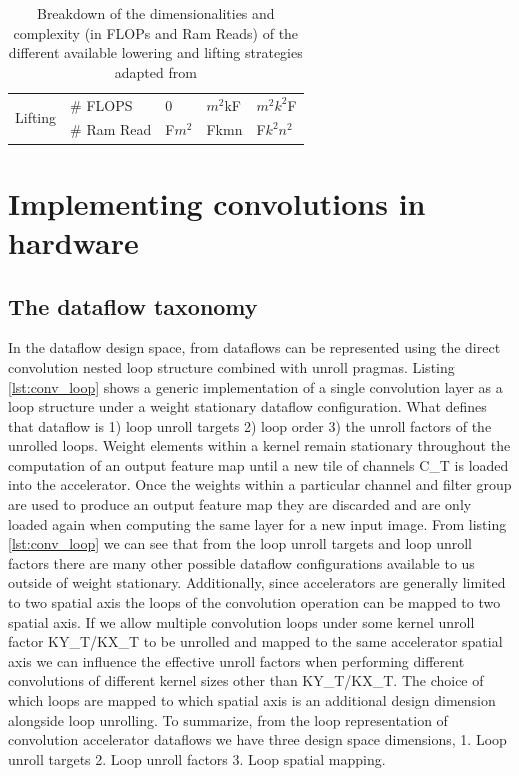 \begin{table}[]
\begin{tabular}{ll|l|l|l|}
    \multicolumn{1}{|l|}{\multirow{2}{*}{Lifting}}                                                    & \# FLOPS            & 0                                                                        & $m^2$kF                                                      & $m^2$$k^2$F                              \\ \cline{2-5} 
    \multicolumn{1}{|l|}{}                                                                            & \# Ram Read         & F$m^2$                                                                   & Fkmn                                                                        & F$k^2$$n^2$                              \\ \hline
    \end{tabular}
    \label{Table:lowering_lifting_breakdown}
    \caption{Breakdown of the dimensionalities and complexity (in FLOPs and Ram Reads) of the different available lowering and lifting strategies adapted from \cite{cafe_con_troll}}
\end{table}
    
\section{Implementing convolutions in hardware}
\subsection{The dataflow taxonomy}

In the dataflow design space, from \cite{dnn_df_overrated} 
dataflows can be represented using the direct convolution
nested loop structure combined with unroll pragmas. Listing \ref{lst:conv_loop} shows a generic
implementation of a single convolution layer as a loop structure under a weight
stationary dataflow configuration. What defines that dataflow is 1) loop unroll
targets 2) loop order 3) the unroll factors of the unrolled loops. Weight elements within a
kernel remain stationary throughout the computation of an output feature map
until a new tile of channels C\_T is loaded into the accelerator. Once the
weights within a particular channel and filter group are used to produce an
output feature map they are discarded and are only loaded again when computing
the same layer for a new input image. From listing \ref{lst:conv_loop} we
can see that from the loop unroll targets and loop unroll factors there are many
other possible dataflow configurations available to us outside of weight
stationary. Additionally, since accelerators are generally limited to two
spatial axis the loops of the convolution operation can be mapped to two spatial
axis. If we allow multiple convolution loops under some kernel unroll factor
KY\_T/KX\_T  to be unrolled and mapped to the same accelerator spatial axis we
can influence the effective unroll factors when performing different
convolutions of different kernel sizes other than KY\_T/KX\_T. The choice of
which loops are mapped to which spatial axis is an additional design dimension
alongside loop unrolling. To summarize, from the loop representation of
convolution accelerator dataflows we have three design space dimensions, 1. Loop
unroll targets 2. Loop unroll factors 3. Loop spatial mapping. 

